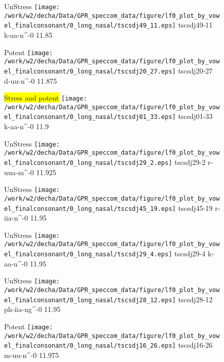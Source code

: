 \documentclass{article}
\begin{document}
\begin{figure}[t]
\begin{minipage}[b]{.24\textwidth}
UnStress
\centering
\texttt{[image: /work/w2/decha/Data/GPR\_speccom\_data/figure/lf0\_plot\_by\_vowel\_finalconsonant/0\_long\_nasal/tscsdj49\_11.eps]}
tscsdj49-11 k-aa-n\textasciicircum-0 11.85
\end{minipage}
\begin{minipage}[b]{.24\textwidth}
\colorbox{Apricot}{Potent}
\centering
\texttt{[image: /work/w2/decha/Data/GPR\_speccom\_data/figure/lf0\_plot\_by\_vowel\_finalconsonant/0\_long\_nasal/tscsdj20\_27.eps]}
tscsdj20-27 d-uu-n\textasciicircum-0 11.875
\end{minipage}
\begin{minipage}[b]{.24\textwidth}
\colorbox{yellow}{Stress and potent}
\centering
\texttt{[image: /work/w2/decha/Data/GPR\_speccom\_data/figure/lf0\_plot\_by\_vowel\_finalconsonant/0\_long\_nasal/tscsdj01\_33.eps]}
tscsdj01-33 k-aa-n\textasciicircum-0 11.9
\end{minipage}
\begin{minipage}[b]{.24\textwidth}
UnStress
\centering
\texttt{[image: /work/w2/decha/Data/GPR\_speccom\_data/figure/lf0\_plot\_by\_vowel\_finalconsonant/0\_long\_nasal/tscsdj29\_2.eps]}
tscsdj29-2 r-uua-m\textasciicircum-0 11.925
\end{minipage}
\end{figure}

\begin{figure}[t]
\begin{minipage}[b]{.24\textwidth}
UnStress
\centering
\texttt{[image: /work/w2/decha/Data/GPR\_speccom\_data/figure/lf0\_plot\_by\_vowel\_finalconsonant/0\_long\_nasal/tscsdj45\_19.eps]}
tscsdj45-19 r-iia-n\textasciicircum-0 11.95
\end{minipage}
\begin{minipage}[b]{.24\textwidth}
UnStress
\centering
\texttt{[image: /work/w2/decha/Data/GPR\_speccom\_data/figure/lf0\_plot\_by\_vowel\_finalconsonant/0\_long\_nasal/tscsdj29\_4.eps]}
tscsdj29-4 k-aa-n\textasciicircum-0 11.95
\end{minipage}
\begin{minipage}[b]{.24\textwidth}
UnStress
\centering
\texttt{[image: /work/w2/decha/Data/GPR\_speccom\_data/figure/lf0\_plot\_by\_vowel\_finalconsonant/0\_long\_nasal/tscsdj28\_12.eps]}
tscsdj28-12 ph-iia-ng\textasciicircum-0 11.95
\end{minipage}
\begin{minipage}[b]{.24\textwidth}
\colorbox{Apricot}{Potent}
\centering
\texttt{[image: /work/w2/decha/Data/GPR\_speccom\_data/figure/lf0\_plot\_by\_vowel\_finalconsonant/0\_long\_nasal/tscsdj16\_26.eps]}
tscsdj16-26 m-uu-n\textasciicircum-0 11.975
\end{minipage}
\end{figure}
\end{document}
